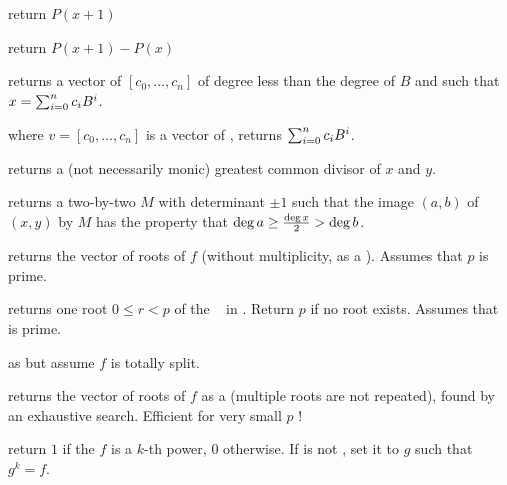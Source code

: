 


 return $P(x+1)$

 return $P(x+1)-P(x)$

 returns a vector of 
$[c_0,\ldots,c_n]$ of degree less than the degree of $B$ and such that
$x=\sum_{i=0}^{n}{c_i\*B^i}$.

 where $v=[c_0,\ldots,c_n]$
is a vector of , returns $\sum_{i=0}^{n}{c_i\*B^i}$.



 returns a (not necessarily monic)
greatest common divisor of $x$  and $y$.

 returns a two-by-two 
$M$ with determinant $\pm 1$ such that the image $(a,b)$ of $(x,y)$ by $M$
has the property that $\deg a \geq {\deg x \over 2} > \deg b$.


 returns the vector of roots
of $f$ (without multiplicity, as a ). Assumes that $p$ is
prime.

 returns one root $0 \leq r < p$ of
the ~ in . Return $p$ if no root exists. Assumes
that  is prime.

 as  but
assume $f$ is totally split.

 returns the vector of roots
of $f$ as a  (multiple roots are not repeated), found
by an exhaustive search. Efficient for very small $p$ !

return $1$ if the  $f$ is a $k$-th power, $0$ otherwise.
If  is not , set it to $g$ such that $g^k = f$.


